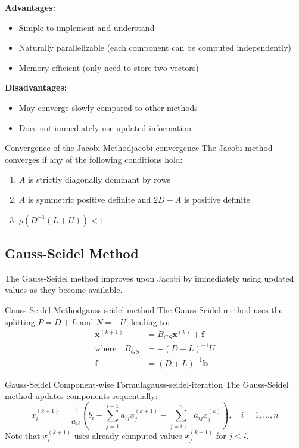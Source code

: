 \textbf{Advantages:}
\begin{itemize}
    \item Simple to implement and understand
    \item Naturally parallelizable (each component can be computed independently)
    \item Memory efficient (only need to store two vectors)
\end{itemize}

\textbf{Disadvantages:}
\begin{itemize}
    \item May converge slowly compared to other methods
    \item Does not immediately use updated information
\end{itemize}

\begin{theorem}{Convergence of the Jacobi Method}{jacobi-convergence}
    The Jacobi method converges if any of the following conditions hold:
    \begin{enumerate}
        \item $A$ is strictly diagonally dominant by rows
        \item $A$ is symmetric positive definite and $2D - A$ is positive definite
        \item $\rho(D^{-1}(L+U)) < 1$
    \end{enumerate}
\end{theorem}

\subsection{Gauss-Seidel Method}

The Gauss-Seidel method improves upon Jacobi by immediately using updated values as they become available.

\begin{definition}{Gauss-Seidel Method}{gauss-seidel-method}
    The Gauss-Seidel method uses the splitting $P = D + L$ and $N = -U$, leading to:
    \begin{align}
        \mathbf{x}^{(k+1)} &= B_{GS} \mathbf{x}^{(k)} + \mathbf{f} \\
        \text{where} \quad B_{GS} &= -(D + L)^{-1}U \\
        \mathbf{f} &= (D + L)^{-1}\mathbf{b}
    \end{align}
\end{definition}

\begin{corollary}{Gauss-Seidel Component-wise Formula}{gauss-seidel-iteration}
    The Gauss-Seidel method updates components sequentially:
    \begin{equation}
        x_i^{(k+1)} = \frac{1}{a_{ii}}\left(b_i - \sum_{j=1}^{i-1} a_{ij} x_j^{(k+1)} - \sum_{j=i+1}^n a_{ij} x_j^{(k)}\right), \quad i = 1, \ldots, n
    \end{equation}
    Note that $x_i^{(k+1)}$ uses already computed values $x_j^{(k+1)}$ for $j < i$.
\end{corollary}

